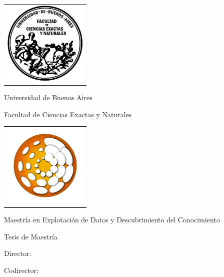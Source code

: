 \newcommand{\HRule}{\rule{\linewidth}{0.2mm}}
%
\thispagestyle{empty}

\begin{center}\leavevmode

\vspace{-2cm}

\begin{tabular}{l}
\includegraphics[width=4cm]{logofcen.pdf}
\end{tabular}

{\large \sc Universidad de Buenos Aires

Facultad de Ciencias Exactas y Naturales}


\begin{tabular}{l}
\includegraphics[width=4cm]{logo_UBA_DM.jpeg}
\end{tabular}

{\large \sc Maestría en Explotación de Datos y Descubrimiento del Conocimiento}


\vspace{4.0cm}


\begin{huge}
\textbf{\tituloTesis}
\end{huge}

\vspace{2cm}

{\large Tesis de Maestría}

\vspace{2cm}

{\Large \autor}

\end{center}

\vfill

{\large

{Director: \director}

\vspace{.2cm}

{Codirector: \codirector}

\vspace{.2cm}

\lugar
}

\newpage\thispagestyle{empty}
